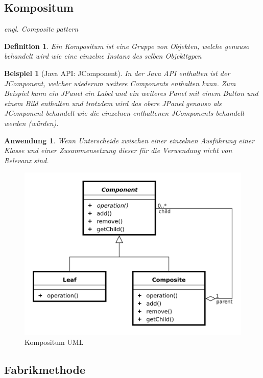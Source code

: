 \documentclass[a4paper]{article}
\theoremstyle{break}
\newtheorem{defi}{Definition}[section]
\newtheorem{ex}{Beispiel}[section]
\newtheorem{why}{Anwendung}[section]
\begin{document}
\newpage
\subsection{Kompositum}

\textit{engl. Composite pattern}

\begin{defi}
	Ein Kompositum ist eine Gruppe von Objekten, welche genauso behandelt wird wie eine einzelne Instanz des selben Objekttypen
\end{defi}

\begin{ex}[Java API: JComponent]
	In der Java API enthalten ist der JComponent, welcher wiederum weitere Components enthalten kann.
	Zum Beispiel kann ein JPanel ein Label und ein weiteres Panel mit einem Button und einem Bild enthalten und trotzdem wird das obere JPanel genauso als JComponent behandelt wie die einzelnen enthaltenen JComponents behandelt werden (würden).
\end{ex}

\begin{why}
	Wenn Unterscheide zwischen einer einzelnen Ausführung einer Klasse und einer Zusammensetzung dieser für die Verwendung nicht von Relevanz sind.
\end{why}
\begin{figure}[H]
	\centering
	\includegraphics[width=\textwidth]{../diagrams/uml/CompositePattern.png}
	\caption{Kompositum UML}
\end{figure}

\newpage
\subsection{Fabrikmethode}
\end{document}
